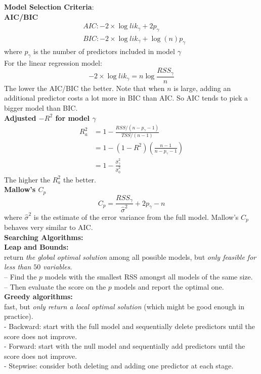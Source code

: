 \documentclass[11pt,a4paper]{article}
\begin{document}
\textbf{Model Selection Criteria}:\\
\textbf{AIC/BIC}\\
$$
\begin{aligned}
&A I C:-2 \times \log l i k_{\gamma}+2 p_{\gamma} \\
&B I C:-2 \times \log l i k_{\gamma}+\log (n) p_{\gamma}
\end{aligned}
$$
where $p_{\gamma}$ is the number of predictors included in model $\gamma$\\
For the linear regression model:
$$
-2 \times \log l i k_{\gamma}=n \log \frac{R S S_{\gamma}}{n}
$$
The lower the AIC/BIC the better. Note that when $n$ is large, adding an additional predictor costs a lot more in BIC than AIC. So AIC tends to pick a bigger model than BIC.\\
\textbf{Adjusted $-R^{2}$ for model $\gamma$}\\
$$
\begin{aligned}
R_{a}^{2} &=1-\frac{R S S /\left(n-p_{\gamma}-1\right)}{T S S /(n-1)} \\
&=1-\left(1-R^{2}\right)\left(\frac{n-1}{n-p_{\gamma}-1}\right) \\
&=1-\frac{\hat{\sigma}_{\gamma}^{2}}{\hat{\sigma}_{0}^{2}}
\end{aligned}
$$
The higher the $R_{a}^{2}$ the better.\\
\textbf{Mallow's $C_{p}$}
$$
C_{p}=\frac{R S S_{\gamma}}{\hat{\sigma}^{2}}+2 p_{\gamma}-n
$$
where $\hat{\sigma}^{2}$ is the estimate of the error variance from the full model. Mallow's $C_{p}$ behaves very similar to AIC.\\

\textbf{Searching Algorithms:}\\
\textbf{Leap and Bounds:}\\
return \textit{the global optimal solution} among all possible models, but \textit{only feasible for less than $50$ variables}.\\
– Find the $p$ models with the smallest RSS amongst all models of the same size.\\
– Then evaluate the score on the $p$ models and report the optimal one.\\
\textbf{Greedy algorithms:}\\
fast, but \textit{only return a local optimal solution} (which might be good enough in practice).\\
- Backward: start with the full model and sequentially delete predictors until the score does not improve.\\
- Forward: start with the null model and sequentially add predictors until the score does not improve.\\
- Stepwise: consider both deleting and adding one predictor at each stage.
\end{document}
